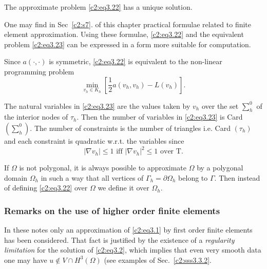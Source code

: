 \begin{proposition}\label{c2:prop3.4}%
The approximate problem \eqref{c2:eq3.22} has a unique solution.
\end{proposition}  
  
  One may find in Sec~\ref{c2:s7}. of this chapter practical  formulae related
  to finite element approximation. Using these formulae, \eqref{c2:eq3.22} and
  the equivalent problem \eqref{c2:eq3.23} can be expressed in a form more
  suitable for computation. 
  
\begin{remark}\label{c2:rem3.7}%
Since  $a(\cdot , \cdot)$ is symmetric, \eqref{c2:eq3.22} is equivalent to the
non-linear programming problem  
\begin{equation}
\min\limits_{v_h \in K_h} \left [ \frac{1}{2} a (v_h, v_h) - L
  (v_h) \right].\tag{3.23}\label{c2:eq3.23} 
\end{equation}
\end{remark} 
  
  The natural variables in \eqref{c2:eq3.23} are the values taken by $v_h$ over
  the set $\sum\limits^{0}_{h}$ of the interior nodes of
  $\tau_h$. Then the number of variables in \eqref{c2:eq3.23} is Card
  $(\sum\limits^{0}_{h})$. The number of constraints is the number of
  triangles i.e. Card $(\tau_h)$ and each constraint is quadratic
  w.r.t. the variables since  
  \begin{equation}
| \nabla v_h | \leq 1 \text{ iff } | \nabla v_h |
^2 \leq 1 \text{ over T}.\tag{3.24}\label{c2:eq3.24} 
 \end{equation} 
 
\begin{remark}\label{c2:rem3.8}%
If $\Omega$ is not polygonal, it is always possible to approximate
$\Omega $ by a polygonal domain $\Omega_h$ in such a way that all
vertices of $\Gamma_h = \partial \Omega_h$ belong to $\Gamma$. Then
instead of defining \eqref{c2:eq3.22} over $\Omega$ we define it over
$\Omega_h$. 
\end{remark}  
  
\subsubsection{Remarks on the use of 
higher order finite elements}\label{c2:sss3.5.3}%
  
  In these notes only an approximation of \eqref{c2:eq3.1} by first order finite
  elements has been considered. That fact is justified by the
  existence of a \textit{regularity limitation} for the solution of
  \eqref{c2:eq3.2}, which implies that even very smooth data one may have $u
  \notin V\cap H^3 (\Omega)$ (see examples of Sec.~\ref{c2:sss3.3.2}. 
  

